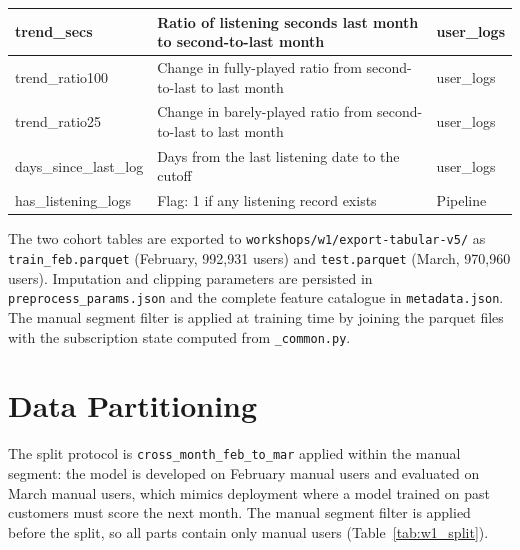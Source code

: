 \documentclass{article}
\begin{document}
\begin{longtable}{|l|p{7.5cm}|l|}
trend\_secs & Ratio of listening seconds last month to second-to-last month & user\_logs \\ \hline
trend\_ratio100 & Change in fully-played ratio from second-to-last to last month & user\_logs \\ \hline
trend\_ratio25 & Change in barely-played ratio from second-to-last to last month & user\_logs \\ \hline
days\_since\_last\_log & Days from the last listening date to the cutoff & user\_logs \\ \hline
has\_listening\_logs & Flag: 1 if any listening record exists & Pipeline \\ \hline
\end{longtable}

The two cohort tables are exported to \texttt{workshops/w1/export-tabular-v5/} as \texttt{train\_feb.parquet} (February, 992{,}931 users) and \texttt{test.parquet} (March, 970{,}960 users). Imputation and clipping parameters are persisted in \texttt{preprocess\_params.json} and the complete feature catalogue in \texttt{metadata.json}. The manual segment filter is applied at training time by joining the parquet files with the subscription state computed from \texttt{\_common.py}.

\section{Data Partitioning}

The split protocol is \texttt{cross\_month\_feb\_to\_mar} applied within the manual segment: the model is developed on February manual users and evaluated on March manual users, which mimics deployment where a model trained on past customers must score the next month. The manual segment filter is applied before the split, so all parts contain only manual users (Table~\ref{tab:w1_split}).
\end{document}

